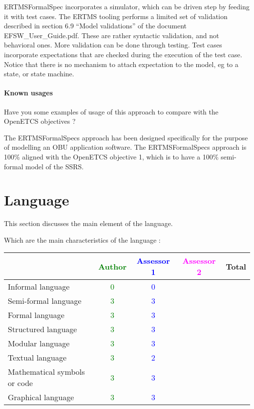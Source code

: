 \begin{assessor1}
ERTMSFormalSpec incorporates a simulator, which can be driven step by feeding it with test cases. 
The ERTMS tooling performs a limited set of validation described in section 6.9 "`Model validations"' of the document EFSW\_User\_Guide.pdf. These are rather syntactic validation, and not behavioral ones. More validation can be done through testing. Test cases incorporate expectations that are checked during the execution of the test case. Notice that there is no mechanism to attach expectation to the model, eg to a state, or state machine.
\end{assessor1}

\paragraph{Known usages} Have you some examples of usage of this approach to compare with the OpenETCS objectives ?

\begin{author_comment}
The ERTMSFormalSpecs approach has been designed specifically for the purpose of modelling an OBU application software. The ERTMSFormalSpecs approach is 100\% aligned with the OpenETCS objective 1, which is to have a 100\% semi-formal model of the SSRS. 
\end{author_comment}

\section{Language}
This section discusses the main element of the language.

Which are the main characteristics of the language :

\begin{tabular}{|l | c | c | c | c|}
\hline
& \textcolor{green}{Author} & \textcolor{blue}{Assessor 1} & \textcolor{magenta}{Assessor 2} & Total \\
\hline 
Informal language & \textcolor{green}{0} & \textcolor{blue}{0} & &  \\
\hline 
Semi-formal language & \textcolor{green}{3} & \textcolor{blue}{3} & &  \\
\hline
Formal language & \textcolor{green}{3} & \textcolor{blue}{3} & &  \\
\hline
Structured language & \textcolor{green}{3} & \textcolor{blue}{3} & & \\
\hline
Modular language & \textcolor{green}{3} & \textcolor{blue}{3} & & \\
\hline
Textual language & \textcolor{green}{3} & \textcolor{blue}{2} & & \\
\hline
Mathematical symbols or code & \textcolor{green}{3} & \textcolor{blue}{3} & & \\
\hline
Graphical language & \textcolor{green}{3} & \textcolor{blue}{3} & & \\
\hline
\end{tabular}

